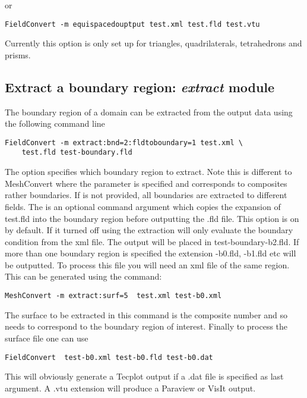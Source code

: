 or

\begin{lstlisting}[style=BashInputStyle]
FieldConvert -m equispacedouptput test.xml test.fld test.vtu
\end{lstlisting}


\begin{notebox} 
Currently this option is only set up for triangles, quadrilaterals,
tetrahedrons and prisms.
\end{notebox}

\subsection{Extract a boundary region: \textit{extract} module}
The boundary region of a domain can be extracted from the output 
data using the following command line
%
\begin{lstlisting}[style=BashInputStyle]
FieldConvert -m extract:bnd=2:fldtoboundary=1 test.xml \
	test.fld test-boundary.fld
\end{lstlisting}
%
The option  specifies which boundary region to extract. 
Note this is different to MeshConvert where the parameter  
is specified and corresponds to composites rather boundaries. If  
is not provided, all boundaries are extracted to different fields. The  
is an optional command argument which copies the expansion of test.fld into 
the boundary region before outputting the .fld file. This option is on by default. 
If it turned off using \inltt{fldtoboundary=0} the extraction will only evaluate the 
boundary condition from the xml file. The output will be placed in test-boundary-b2.fld. 
If more than one boundary region is specified the extension -b0.fld, -b1.fld etc will be 
outputted. To process this file you will need an xml file of the same region. 
This can be generated using the command:
%
\begin{lstlisting}[style=BashInputStyle]
MeshConvert -m extract:surf=5  test.xml test-b0.xml
\end{lstlisting}
%
The surface to be extracted in this command is the composite 
number and so needs to correspond to the boundary region 
of interest. Finally to process the surface file one can use
%
\begin{lstlisting}[style=BashInputStyle]
FieldConvert  test-b0.xml test-b0.fld test-b0.dat
\end{lstlisting}
%
This will obviously generate a Tecplot output if a .dat file 
is specified as last argument. A .vtu extension will produce 
a Paraview or VisIt output.
%
%
%
